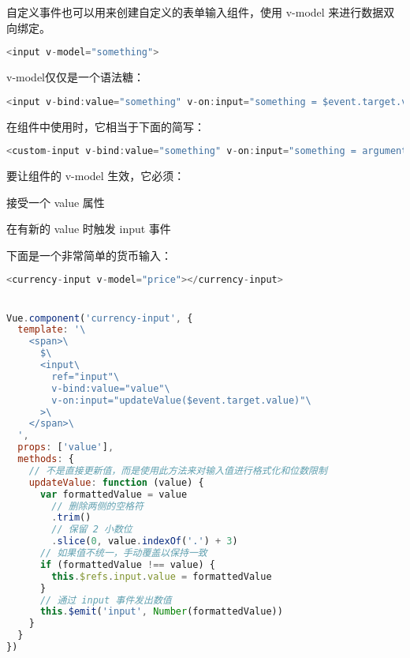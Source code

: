 自定义事件也可以用来创建自定义的表单输入组件，使用 v-model 来进行数据双向绑定。


\begin{lstlisting}[language=JavaScript]
<input v-model="something">
\end{lstlisting}

v-model仅仅是一个语法糖：

\begin{lstlisting}[language=JavaScript]
<input v-bind:value="something" v-on:input="something = $event.target.value">
\end{lstlisting}

在组件中使用时，它相当于下面的简写：

\begin{lstlisting}[language=JavaScript]
<custom-input v-bind:value="something" v-on:input="something = arguments[0]"></custom-input>
\end{lstlisting}

要让组件的 v-model 生效，它必须：

\begin{compactitem}
\item 接受一个 value 属性
\item 在有新的 value 时触发 input 事件
\end{compactitem}

下面是一个非常简单的货币输入：

\begin{lstlisting}[language=JavaScript]
<currency-input v-model="price"></currency-input>


Vue.component('currency-input', {
  template: '\
    <span>\
      $\
      <input\
        ref="input"\
        v-bind:value="value"\
        v-on:input="updateValue($event.target.value)"\
      >\
    </span>\
  ',
  props: ['value'],
  methods: {
    // 不是直接更新值，而是使用此方法来对输入值进行格式化和位数限制
    updateValue: function (value) {
      var formattedValue = value
        // 删除两侧的空格符
        .trim()
        // 保留 2 小数位
        .slice(0, value.indexOf('.') + 3)
      // 如果值不统一，手动覆盖以保持一致
      if (formattedValue !== value) {
        this.$refs.input.value = formattedValue
      }
      // 通过 input 事件发出数值
      this.$emit('input', Number(formattedValue))
    }
  }
})
\end{lstlisting}




\begin{lstlisting}[language=JavaScript]

\end{lstlisting}



